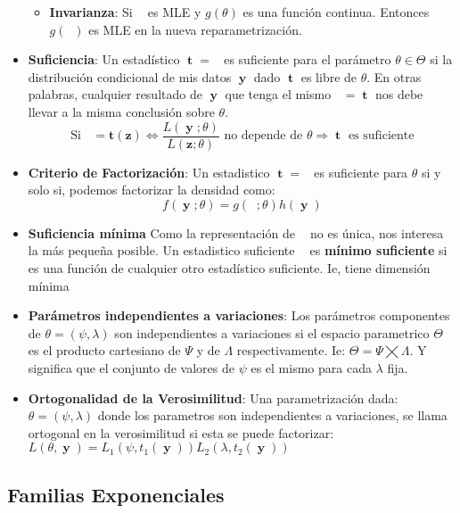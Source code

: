 \documentclass[pdftex,11pt,a4paper]{article}
\DeclareMathOperator{\muestra}{\mathbf{y}}
\DeclareMathOperator{\that}{\mathbf{\hat{\theta}}}
\DeclareMathOperator{\est}{\mathbf{t}}
\DeclareMathOperator{\ty}{\mathbf{t}(\muestra)}
\begin{document}
\begin{itemize}
\begin{itemize}
		\item \textbf{Invarianza}: Si $\that$ es MLE y $g(\theta)$ es una función continua. Entonces $g(\that)$ es MLE en la nueva reparametrización. 
	\end{itemize}
	\item \textbf{Suficiencia}: Un estadístico $\est = \ty$ es suficiente para el parámetro $\theta \in \Theta$ si la distribución condicional de mis datos $\muestra$ dado $\est$ es libre de $\theta$. En otras palabras, cualquier resultado de $\muestra$ que tenga el mismo $\ty = \est$ nos debe llevar a la misma conclusión sobre $\theta$. $$ \text{Si } \ty = \mathbf{t}(\mathbf{z}) \iff \dfrac{L(\muestra;\theta)}{L(\mathbf{z};\theta)} \text{ no depende de } \theta \Rightarrow \est \text{ es suficiente}$$ 
	\item \textbf{Criterio de Factorización}: Un estadistico $\est = \ty$ es suficiente para $\theta$ si y solo si, podemos factorizar la densidad como: $$f(\muestra;\theta) = g(\ty;\theta)h(\muestra)$$
	\item \textbf{Suficiencia mínima} Como la representación de $\ty$ no es única, nos interesa la más pequeña posible. Un estadistico suficiente $\ty$ es \textbf{mínimo suficiente} si es una función de cualquier otro estadístico suficiente. Ie, tiene dimensión mínima
	\item \textbf{Parámetros independientes a variaciones}: Los parámetros componentes de $\theta = (\psi,\lambda)$ son independientes a variaciones si el espacio parametrico $\Theta$ es el producto cartesiano de $\Psi$ y de $\Lambda$ respectivamente. Ie: $\Theta = \Psi \bigtimes \Lambda$. Y significa que el conjunto de valores de $\psi$ es el mismo para cada $\lambda$ fija.
	\item \textbf{Ortogonalidad de la Verosimilitud}: Una parametrización dada: $\theta = (\psi,\lambda)$ donde los parametros son independientes a variaciones, se llama ortogonal en la verosimilitud si esta se puede factorizar: $L(\theta,\muestra) = L_1(\psi,t_1(\muestra))L_2(\lambda,t_2(\muestra))$ 
\end{itemize}

\subsection{Familias Exponenciales}
\end{document}
